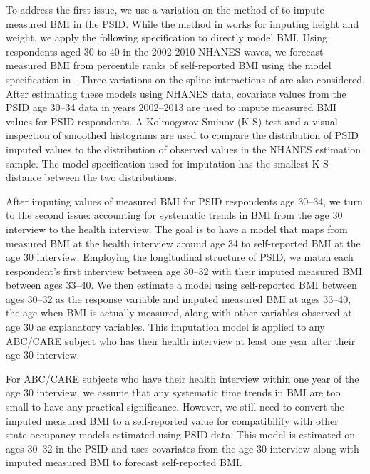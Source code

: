 \noindent To address the first issue, we use a variation on the method of \citet*{Courtemanche_etal_2015_Adjusting-Body-Mass} to impute measured BMI in the PSID.
While the method in \citet{Courtemanche_etal_2015_Adjusting-Body-Mass} works for imputing height and weight, we apply the following specification to directly model BMI. Using respondents aged 30 to 40 in the 2002-2010 NHANES waves, we forecast measured BMI from percentile ranks of self-reported BMI using the model specification in \citet{Courtemanche_etal_2015_Adjusting-Body-Mass}. Three variations
on the spline interactions of \citet{Courtemanche_etal_2015_Adjusting-Body-Mass} are also considered. After estimating these models using NHANES data, covariate values from the PSID
age 30--34 data in years 2002--2013 are used to impute measured BMI values for PSID respondents. A Kolmogorov-Sminov (K-S) test and a visual inspection of smoothed histograms are used to compare the distribution of PSID imputed values to the distribution of observed values in the NHANES estimation sample. The model specification used for imputation has the smallest K-S distance between the two distributions.

\noindent After imputing values of measured BMI for PSID respondents age 30--34, we turn to the second issue: accounting for systematic trends in BMI from the age 30 interview to the health interview. The goal is to have a model that maps from measured BMI at the health interview around age 34 to self-reported BMI at the age 30 interview. Employing the longitudinal structure of PSID, we match each respondent's first interview between age 30--32 with their imputed measured BMI between ages 33--40. We then estimate a model using self-reported BMI between ages 30--32 as the response variable and imputed measured BMI at ages 33--40, the age when BMI is actually measured, along with other variables observed at age 30 as explanatory variables. This imputation model is applied to any ABC/CARE subject who has their health interview at least one year after their age 30 interview.

\noindent For ABC/CARE subjects who have their health interview within one year of the age 30 interview, we assume that any systematic time trends in BMI are too small to have any practical significance. However, we still need to convert the imputed measured BMI to a self-reported value for compatibility with other state-occupancy models estimated using PSID data. This model is estimated on ages 30--32 in the PSID and uses covariates from the age 30 interview along with imputed measured BMI to forecast self-reported BMI.


